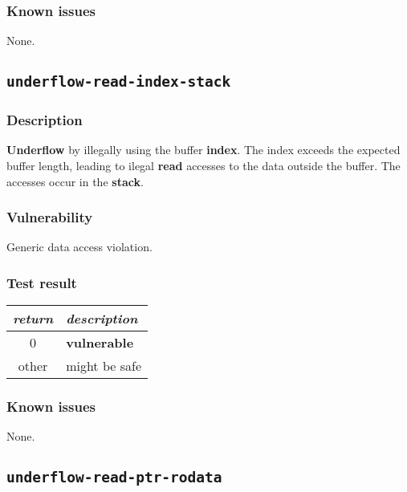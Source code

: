 \documentclass[a4paper]{book}
\begin{document}
\subsubsection{Known issues}

None.

\newpage

\subsection{\texttt{underflow-read-index-stack}}\label{test-underflow-read-index-stack}

\subsubsection{Description}

\textbf{Underflow} by illegally using the buffer \textbf{index}.
The index exceeds the expected buffer length,
leading to ilegal \textbf{read} accesses to the data outside the buffer.
The accesses occur in the \textbf{stack}.

\subsubsection{Vulnerability}
Generic data access violation.

\subsubsection{Test result}

\begin{tabular}{cl}
  \toprule
  \emph{return}  & \emph{description} \\
  \midrule
  0              & \textbf{vulnerable} \\
  other          & might be safe \\
  \bottomrule
\end{tabular}

\subsubsection{Known issues}

None.

\newpage

\subsection{\texttt{underflow-read-ptr-rodata}}\label{test-underflow-read-ptr-rodata}
\end{document}
